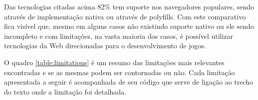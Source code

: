 
Das tecnologias citadas acima 82\% tem suporte nos navegadores
populares, sendo através de implementação nativa ou através de
polyfills. Com este comparativo fica visível que, mesmo em alguns
casos não existindo suporte nativo ou ele sendo incompleto e com
limitações, na vasta maioria dos casos, é possível utilizar
tecnologias da Web direcionadas para o desenvolvimento de jogos.

\newpage

O quadro \ref{table:limitations} é um resumo das limitações mais
relevantes encontradas e se as mesmas podem ser contornadas ou não.
Cada limitação apresentada a seguir é acompanhada de seu código que
serve de ligação ao trecho do texto onde a limitação foi detalhada.


